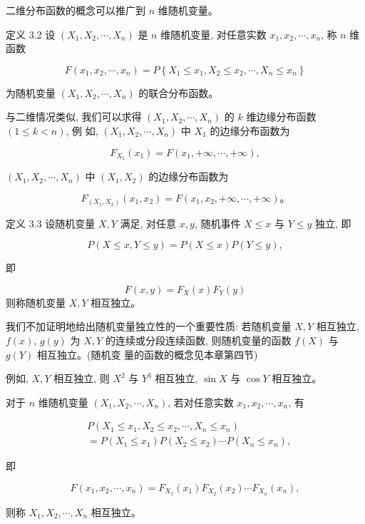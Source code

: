 \documentclass{beamer}
\begin{document}
	\begin{frame}
		二维分布函数的概念可以推广到 $n$ 维随机变量。
		
		定义 3.2 设 $\left(X_{1}, X_{2}, \cdots, X_{n}\right)$ 是 $n$ 维随机变量, 对任意实数 $x_{1}, x_{2}, \cdots, x_{n}$, 称 $n$ 维 函数
		
		$$
		F\left(x_{1}, x_{2}, \cdots, x_{n}\right)=P\left\{X_{1} \leqslant x_{1}, X_{2} \leqslant x_{2}, \cdots, X_{n} \leqslant x_{n}\right\}
		$$
		
		为随机变量 $\left(X_{1}, X_{2}, \cdots, X_{n}\right)$ 的联合分布函数。
		
		与二维情况类似, 我们可以求得 $\left(X_{1}, X_{2}, \cdots, X_{n}\right)$ 的 $k$ 维边缘分布函数 $(1 \leqslant k<n)$, 例 如, $\left(X_{1}, X_{2}, \cdots, X_{n}\right)$ 中 $X_{1}$ 的边缘分布函数为
		
		$$
		F_{X_{1}}\left(x_{1}\right)=F\left(x_{1},+\infty, \cdots,+\infty\right),
		$$
		
		$\left(X_{1}, X_{2}, \cdots, X_{n}\right)$ 中 $\left(X_{1}, X_{2}\right)$ 的边缘分布函数为
		
		$$
		F_{\left(X_{1}, X_{2}\right)}\left(x_{1}, x_{2}\right)=F\left(x_{1}, x_{2},+\infty, \cdots,+\infty\right) 。
		$$
	\end{frame}
	
	\begin{frame}
		定义 3.3 设随机变量 $X, Y$ 满足, 对任意 $x, y$, 随机事件 $X \leqslant x$ 与 $Y \leqslant y$ 独立, 即
		
		$$
		P(X \leqslant x, Y \leqslant y)=P(X \leqslant x) P(Y \leqslant y),
		$$
		
		即
		
		$$
		F(x, y)=F_{X}(x) F_{Y}(y)
		$$
		则称随机变量 $X, Y$ 相互独立。
		
		我们不加证明地给出随机变量独立性的一个重要性质: 若随机变量 $X, Y$ 相互独立, $f(x)$, $g(y)$ 为 $X, Y$ 的连续或分段连续函数, 则随机变量的函数 $f(X)$ 与 $g(Y)$ 相互独立。(随机变 量的函数的概念见本章第四节)
		
		例如, $X, Y$ 相互独立, 则 $X^{2}$ 与 $Y^{3}$ 相互独立, $\sin X$ 与 $\cos Y$ 相互独立。
		
		对于 $n$ 维随机变量 $\left(X_{1}, X_{2}, \cdots, X_{n}\right)$, 若对任意实数 $x_{1}, x_{2}, \cdots, x_{n}$, 有
		
		
	\end{frame}
	
	\begin{frame}
		\begin{align}
			& P\left(X_{1} \leqslant x_{1}, X_{2} \leqslant x_{2}, \cdots, X_{n} \leqslant x_{n}\right) \\
			&=P\left(X_{1} \leqslant x_{1}\right) P\left(X_{2} \leqslant x_{2}\right) \cdots P\left(X_{n} \leqslant x_{n}\right),
		\end{align}
		
		
		
		即
		
		$$
		F\left(x_{1}, x_{2}, \cdots, x_{n}\right)=F_{X_{1}}\left(x_{1}\right) F_{X_{2}}\left(x_{2}\right) \cdots F_{X_{n}}\left(x_{n}\right),
		$$
		
		则称 $X_{1}, X_{2}, \cdots, X_{n}$ 相互独立。
	\end{frame}
	
\end{document}
